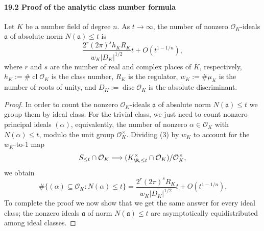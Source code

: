 \paragraph{19.2 Proof of the analytic class number formula}
\begin{theorem}[19.8]
Let $K$ be a number field of degree $n$. As $t\to\infty$, the number of nonzero $\mathcal O_K$-ideals $\mathfrak a$ of absolute norm $N(\mathfrak a)\leq t$ is
\[
\frac{2^r(2\pi)^sh_KR_K}{w_K|D_K|^{1/2}}t+O(t^{1-1/n}),
\]
where $r$ and $s$ are the number of real and complex places of $K$, respectively, $h_K:=\#\operatorname{cl}\mathcal O_K$ is the class number, $R_K$ is the regulator, $w_K:=\#\mu_K$ is the number of roots of unity, and $D_K:=\operatorname{disc}\mathcal O_K$ is the absolute discriminant.
\end{theorem}
\begin{proof}
In order to count the nonzero $\mathcal O_K$-ideals $\mathfrak a$ of absolute norm $N(\mathfrak a)\leq t$ we group them by ideal class. For the trivial class, we just need to count nonzero principal ideals $(\alpha)$, equivalently, the number of nonzero $\alpha\in\mathcal O_K$ with $N(\alpha)\leq t$, modulo the unit group $\mathcal O_K^\times$. Dividing (3) by $w_K$ to account for the $w_K$-to-1 map
\[
S_{\leq t}\cap\mathcal O_K\longrightarrow(K_{\R,\leq t}^\times\cap\mathcal O_K)/\mathcal O_K^\times,
\]
we obtain
\[
\#\{(\alpha)\subseteq\mathcal O_K:N(\alpha)\leq t\}=\frac{2^r(2\pi)^sR_K}{w_K|D_K|^{1/2}}t+O(t^{1-1/n}).\tag{4}
\]
To complete the proof we now show that we get the same answer for every ideal class; the nonzero ideals $\mathfrak a$ of norm $N(\mathfrak a)\leq t$ are asymptotically equidistributed among ideal classes.


\end{proof}
